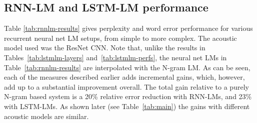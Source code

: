 \documentclass{article}
\begin{document}
\subsection{RNN-LM and LSTM-LM performance}
Table \ref{tab:rnnlm-results} gives perplexity and word error performance for various recurrent neural net LM setups,
from simple to more complex.  The acoustic model used was the ResNet CNN.
Note that, unlike the results in Tables~\ref{tab:lstmlm-layers} and~\ref{tab:lstmlm-perfs},
the neural net LMs in Table~\ref{tab:rnnlm-results} are interpolated with the N-gram LM.
As can be seen, each of the measures described earlier adds incremental gains, which, however, add up to a
substantial improvement overall.
The total gain relative to a purely N-gram based system is a 20\% relative error reduction with RNN-LMs,
and 23\% with LSTM-LMs.
As shown later (see Table~\ref{tab:main}) the gains with different acoustic models are similar.
\end{document}

